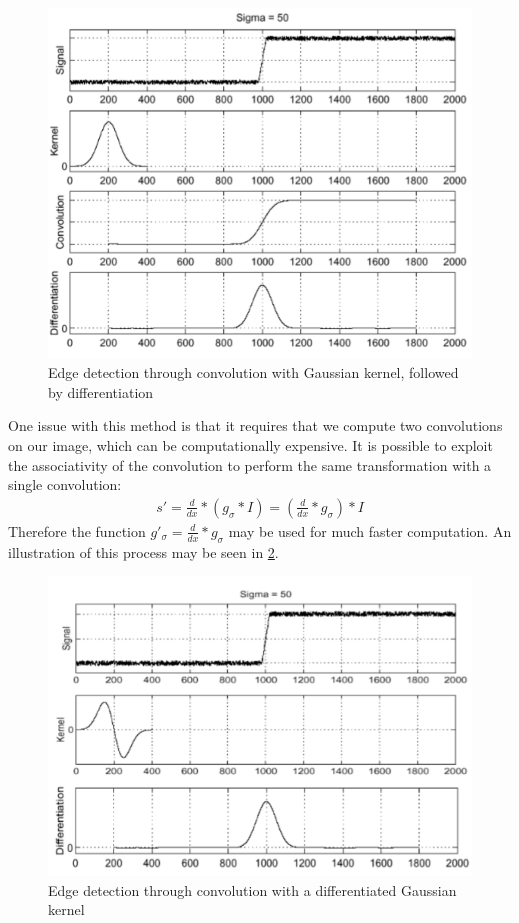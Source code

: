 \documentclass[twoside]{article}
\begin{document}
\begin{figure}[h]
  \centering
  \includegraphics[scale=.4]{gaussian.PNG}
    \caption{Edge detection through convolution with Gaussian kernel, followed by differentiation}
    \label{gauss}
\end{figure}

One issue with this method is that it requires that we compute two convolutions on our image, which can be computationally expensive. It is possible to exploit the associativity of the convolution to perform the same transformation with a single convolution:
\begin{gather*}
s'=\frac{d}{dx} * (g_\sigma * I)=(\frac{d}{dx} * g_\sigma) * I
\end{gather*}
Therefore the function $g'_\sigma=\frac{d}{dx} * g_\sigma$ may be used for much faster computation. An illustration of this process may be seen in \ref{ker}.

\begin{figure}[h]
  \centering
  \includegraphics[scale=.5]{better_kernel.PNG}
    \caption{Edge detection through convolution with a differentiated Gaussian kernel}
    \label{ker}
\end{figure}
\end{document}
